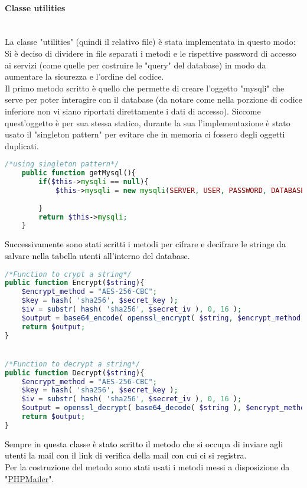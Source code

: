 \paragraph{Classe utilities}\leavevmode\\
La classe "utilities" (quindi il relativo file) è stata implementata in questo modo:\\
Si è deciso di dividere in file separati i metodi e le rispettive password di accesso ai servizi (come quelle per costruire le "query" del database) in modo da aumentare la sicurezza e l'ordine del codice.\\
Il primo metodo scritto è quello che permette di creare l'oggetto "mysqli" che serve per poter interagire con il database (da notare come nella porzione di codice inferiore non vi siano riportati direttamente i dati di accesso). Siccome quest'oggetto è per sua stessa statico, durante la sua l'implementazione è stato usato il "singleton pattern" per evitare che in memoria ci fossero degli oggetti duplicati.\\

\begin{lstlisting}[language=php]
	/*using singleton pattern*/
	public function getMysql(){
		if($this->mysqli == null){
			$this->mysqli = new mysqli(SERVER, USER, PASSWORD, DATABASE);
			
		}
		return $this->mysqli;
	}
\end{lstlisting}

\textcolor{black}{Successivamente sono stati scritti i metodi per cifrare e decifrare le stringe da salvare nella tabella utenti all'interno del database.}\\

\begin{lstlisting}[language=php]
/*Function to crypt a string*/
public function Encrypt($string){
	$encrypt_method = "AES-256-CBC";
	$key = hash( 'sha256', $secret_key );
	$iv = substr( hash( 'sha256', $secret_iv ), 0, 16 );
	$output = base64_encode( openssl_encrypt( $string, $encrypt_method, $key, 0, $iv ) );
	return $output;
}


/*Function to decrypt a string*/
public function Decrypt($string){
	$encrypt_method = "AES-256-CBC";
	$key = hash( 'sha256', $secret_key );
	$iv = substr( hash( 'sha256', $secret_iv ), 0, 16 );
	$output = openssl_decrypt( base64_decode( $string ), $encrypt_method, $key, 0, $iv );
	return $output;
}
\end{lstlisting}

\textcolor{black}{Sempre in questa classe è stato scritto il metodo che si occupa di inviare agli utenti la mail con il link di verifica della mail con cui ci si registra.\\
Per la costruzione del metodo sono stati usati i metodi messi a disposizione da "\href{https://github.com/PHPMailer/PHPMailer}{PHPMailer}"}.

